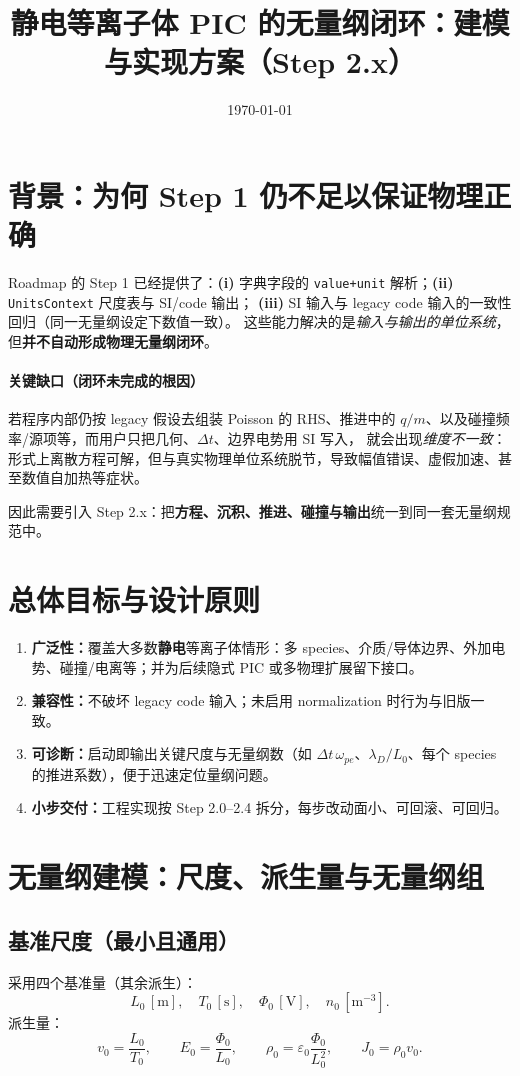 \documentclass[11pt,a4paper]{ctexart}
\title{静电等离子体 PIC 的无量纲闭环：建模与实现方案（Step 2.x）}
\author{}
\date{\today}
\begin{document}
\maketitle

\section{背景：为何 Step 1 仍不足以保证物理正确}
Roadmap 的 Step 1 已经提供了：\textbf{(i)} 字典字段的 \texttt{value+unit} 解析；\textbf{(ii)} \texttt{UnitsContext} 尺度表与 SI/code 输出；
\textbf{(iii)} SI 输入与 legacy code 输入的一致性回归（同一无量纲设定下数值一致）。
这些能力解决的是\emph{输入与输出的单位系统}，但\textbf{并不自动形成物理无量纲闭环}。

\paragraph{关键缺口（闭环未完成的根因）}
若程序内部仍按 legacy 假设去组装 Poisson 的 RHS、推进中的 $q/m$、以及碰撞频率/源项等，而用户只把几何、$\Delta t$、边界电势用 SI 写入，
就会出现\emph{维度不一致}：形式上离散方程可解，但与真实物理单位系统脱节，导致幅值错误、虚假加速、甚至数值自加热等症状。

因此需要引入 Step 2.x：把\textbf{方程、沉积、推进、碰撞与输出}统一到同一套无量纲规范中。

\section{总体目标与设计原则}
\begin{enumerate}[leftmargin=2em]
\item \textbf{广泛性：}覆盖大多数\textbf{静电}等离子体情形：多 species、介质/导体边界、外加电势、碰撞/电离等；并为后续隐式 PIC 或多物理扩展留下接口。
\item \textbf{兼容性：}不破坏 legacy code 输入；未启用 normalization 时行为与旧版一致。
\item \textbf{可诊断：}启动即输出关键尺度与无量纲数（如 $\Delta t\,\omega_{pe}$、$\lambda_D/L_0$、每个 species 的推进系数），便于迅速定位量纲问题。
\item \textbf{小步交付：}工程实现按 Step 2.0--2.4 拆分，每步改动面小、可回滚、可回归。
\end{enumerate}

\section{无量纲建模：尺度、派生量与无量纲组}
\subsection{基准尺度（最小且通用）}
采用四个基准量（其余派生）：
\[
L_0\,[\mathrm{m}],\quad T_0\,[\mathrm{s}],\quad \Phi_0\,[\mathrm{V}],\quad n_0\,[\mathrm{m^{-3}}].
\]
派生量：
\[
v_0=\frac{L_0}{T_0},\qquad E_0=\frac{\Phi_0}{L_0},\qquad \rho_0=\varepsilon_0\frac{\Phi_0}{L_0^2},\qquad J_0=\rho_0 v_0.
\]
\end{document}

